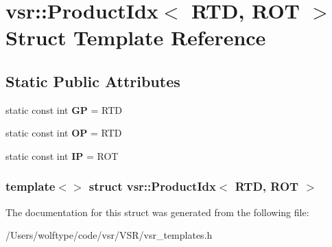 \hypertarget{structvsr_1_1_product_idx_3_01_r_t_d_00_01_r_o_t_01_4}{\section{vsr\-:\-:Product\-Idx$<$ R\-T\-D, R\-O\-T $>$ Struct Template Reference}
\label{structvsr_1_1_product_idx_3_01_r_t_d_00_01_r_o_t_01_4}
}
\subsection*{Static Public Attributes}
\begin{DoxyCompactItemize}
\item 
\hypertarget{structvsr_1_1_product_idx_3_01_r_t_d_00_01_r_o_t_01_4_af025a98dd3766cc6ef418baeb349b52e}{static const int {\bfseries G\-P} = R\-T\-D}\label{structvsr_1_1_product_idx_3_01_r_t_d_00_01_r_o_t_01_4_af025a98dd3766cc6ef418baeb349b52e}

\item 
\hypertarget{structvsr_1_1_product_idx_3_01_r_t_d_00_01_r_o_t_01_4_a9faec66eb908d8fe0877e07a0a804641}{static const int {\bfseries O\-P} = R\-T\-D}\label{structvsr_1_1_product_idx_3_01_r_t_d_00_01_r_o_t_01_4_a9faec66eb908d8fe0877e07a0a804641}

\item 
\hypertarget{structvsr_1_1_product_idx_3_01_r_t_d_00_01_r_o_t_01_4_a6c209e85f3ff9765b12cd9730a79aeb2}{static const int {\bfseries I\-P} = R\-O\-T}\label{structvsr_1_1_product_idx_3_01_r_t_d_00_01_r_o_t_01_4_a6c209e85f3ff9765b12cd9730a79aeb2}

\end{DoxyCompactItemize}
\subsubsection*{template$<$$>$ struct vsr\-::\-Product\-Idx$<$ R\-T\-D, R\-O\-T $>$}



The documentation for this struct was generated from the following file\-:\begin{DoxyCompactItemize}
\item 
/\-Users/wolftype/code/vsr/\-V\-S\-R/vsr\-\_\-templates.\-h\end{DoxyCompactItemize}
